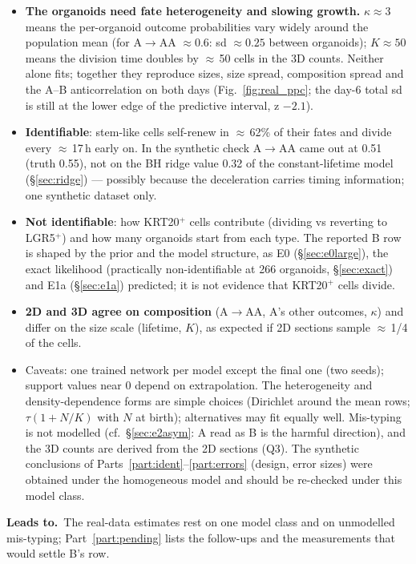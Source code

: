 \documentclass[10pt,a4paper]{article}
\newcommand{\Leads}[1]{\begin{leadbox}{\sffamily\bfseries\color{caqua!70!black}Leads to.}\ #1\end{leadbox}}
\begin{document}
\begin{itemize}
\item \textbf{The organoids need fate heterogeneity and slowing growth.} $\kappa \approx 3$ means the per-organoid outcome probabilities vary widely around the population mean (for A$\to$AA $\approx 0.6$: sd $\approx 0.25$ between organoids); $K \approx 50$ means the division time doubles by $\approx$\,50 cells in the 3D counts. Neither alone fits; together they reproduce sizes, size spread, composition spread and the A--B anticorrelation on both days (Fig.~\ref{fig:real_ppc}; the day-6 total sd is still at the lower edge of the predictive interval, z $-2.1$).
\item \textbf{Identifiable}: stem-like cells self-renew in $\approx$\,62\% of their fates and divide every $\approx$\,17\,h early on. In the synthetic check A$\to$AA came out at 0.51 (truth 0.55), not on the BH ridge value 0.32 of the constant-lifetime model (\S\ref{sec:ridge}) --- possibly because the deceleration carries timing information; one synthetic dataset only.
\item \textbf{Not identifiable}: how KRT20$^+$ cells contribute (dividing vs reverting to LGR5$^+$) and how many organoids start from each type. The reported B row is shaped by the prior and the model structure, as E0 (\S\ref{sec:e0large}), the exact likelihood (practically non-identifiable at 266 organoids, \S\ref{sec:exact}) and E1a (\S\ref{sec:e1a}) predicted; it is not evidence that KRT20$^+$ cells divide.
\item \textbf{2D and 3D agree on composition} (A$\to$AA, A's other outcomes, $\kappa$) and differ on the size scale (lifetime, $K$), as expected if 2D sections sample $\approx$\,1/4 of the cells.
\item Caveats: one trained network per model except the final one (two seeds); support values near 0 depend on extrapolation. The heterogeneity and density-dependence forms are simple choices (Dirichlet around the mean rows; $\tau(1+N/K)$ with $N$ at birth); alternatives may fit equally well. Mis-typing is not modelled (cf.\ \S\ref{sec:e2asym}: A read as B is the harmful direction), and the 3D counts are derived from the 2D sections (Q3). The synthetic conclusions of Parts~\ref{part:ident}--\ref{part:errors} (design, error sizes) were obtained under the homogeneous model and should be re-checked under this model class.
\end{itemize}
\Leads{The real-data estimates rest on one model class and on unmodelled mis-typing; Part~\ref{part:pending} lists the follow-ups and the measurements that would settle B's row.}
\end{document}
